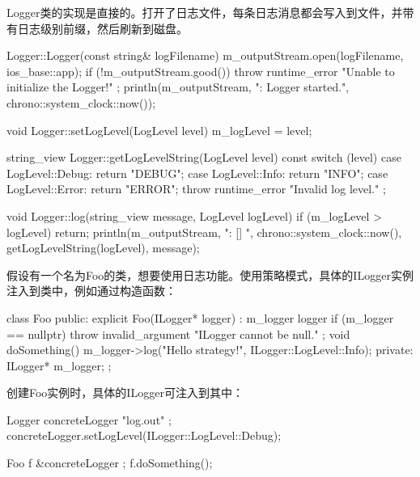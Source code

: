 Logger类的实现是直接的。打开了日志文件，每条日志消息都会写入到文件，并带有日志级别前缀，然后刷新到磁盘。

\begin{cpp}
Logger::Logger(const string& logFilename)
{
    m_outputStream.open(logFilename, ios_base::app);
    if (!m_outputStream.good()) {
        throw runtime_error { "Unable to initialize the Logger!" };
    }
    println(m_outputStream, "{}: Logger started.", chrono::system_clock::now());
}

void Logger::setLogLevel(LogLevel level)
{
    m_logLevel = level;
}

string_view Logger::getLogLevelString(LogLevel level) const
{
    switch (level) {
        case LogLevel::Debug: return "DEBUG";
        case LogLevel::Info: return "INFO";
        case LogLevel::Error: return "ERROR";
    }
    throw runtime_error { "Invalid log level." };
}

void Logger::log(string_view message, LogLevel logLevel)
{
    if (m_logLevel > logLevel) { return; }
    println(m_outputStream, "{}: [{}] {}", chrono::system_clock::now(),
        getLogLevelString(logLevel), message);
}
\end{cpp}


假设有一个名为Foo的类，想要使用日志功能。使用策略模式，具体的ILogger实例注入到类中，例如通过构造函数：

\begin{cpp}
class Foo
{
    public:
        explicit Foo(ILogger* logger) : m_logger { logger }
        {
            if (m_logger == nullptr) {
                throw invalid_argument { "ILogger cannot be null." };
            }
        }
        void doSomething()
        {
            m_logger->log("Hello strategy!", ILogger::LogLevel::Info);
        }
    private:
        ILogger* m_logger;
};
\end{cpp}

创建Foo实例时，具体的ILogger可注入到其中：

\begin{cpp}
Logger concreteLogger { "log.out" };
concreteLogger.setLogLevel(ILogger::LogLevel::Debug);

Foo f { &concreteLogger };
f.doSomething();
\end{cpp}






























